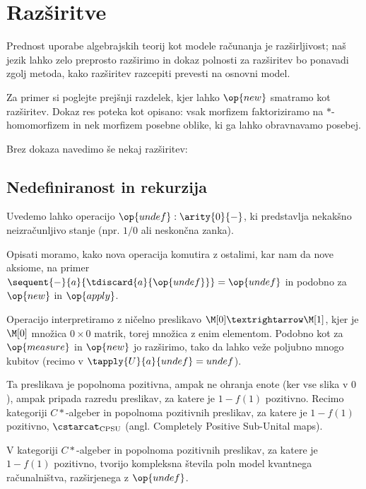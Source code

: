 \section{Razširitve}

Prednost uporabe algebrajskih teorij kot modele računanja je razširljivost;
naš jezik lahko zelo preprosto razširimo in dokaz polnosti za razširitev bo ponavadi zgolj metoda, kako razširitev razcepiti prevesti na osnovni model.

Za primer si poglejte prejšnji razdelek, kjer lahko \(\op{new}\) smatramo kot razširitev.
Dokaz res poteka kot opisano: vsak morfizem faktoriziramo na \(*\)-homomorfizem in nek morfizem posebne oblike, ki ga lahko obravnavamo posebej.

Brez dokaza navedimo še nekaj razširitev:

\subsection{Nedefiniranost in rekurzija}

Uvedemo lahko operacijo \(\op{undef} : \arity{0}{-}\), ki predstavlja nekakšno neizračunljivo stanje (npr. \(1/0\) ali neskončna zanka).

Opisati moramo, kako nova operacija komutira z ostalimi, kar nam da nove aksiome, na primer \(\sequent{-}{a}{\tdiscard{a}{\op{undef}}} = \op{undef}\) in podobno za \(\op{new}\) in \(\op{apply}\).

Operacijo interpretiramo z ničelno preslikavo \(\M[0] → \M[1]\), kjer je \(\M[0]\) množica \(0×0\) matrik, torej množica z enim elementom.
Podobno kot za \(\op{measure}\) in \(\op{new}\) jo razširimo, tako da lahko veže poljubno mnogo kubitov (recimo v \(\tapply{U}{a}{undef} = undef\)).

Ta preslikava je popolnoma pozitivna, ampak ne ohranja enote (ker vse slika v \(0\)), ampak pripada razredu preslikav, za katere je \(1 - f(1)\) pozitivno.
Recimo kategoriji \(C*\)-algeber in popolnoma pozitivnih preslikav, za katere je \(1-f(1)\) pozitivno, \(\cstarcat_{\textrm{CPSU}}\) (angl. \foreignlanguage{english}{Completely Positive Sub-Unital maps}).

\begin{proposition}
    V kategoriji \(C*\)-algeber in popolnoma pozitivnih preslikav, za katere je \(1-f(1)\) pozitivno,
    tvorijo kompleksna števila poln model kvantnega računalništva, razširjenega z \(\op{undef}\).
\end{proposition}

